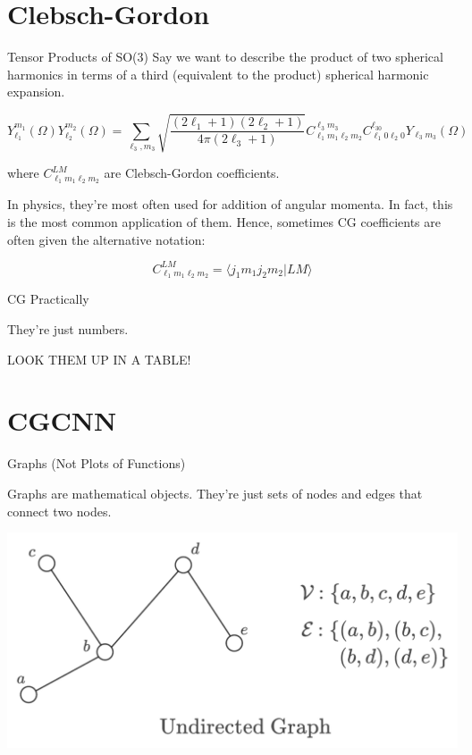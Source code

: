 \documentclass[handout, 11pt]{beamer}
\begin{document}
\section{Clebsch-Gordon}
\begin{frame}{Tensor Products of SO(3)}
Say we want to describe the product of two spherical harmonics in terms of a third (equivalent to the product) spherical harmonic expansion. \small

$$
Y_{\ell_1}^{m_1}(\Omega)Y_{\ell_2}^{m_2}(\Omega)=\sum_{\ell_3, m_3}\sqrt{\frac{(2\ell_1+1)(2\ell_2+1)}{4\pi(2\ell_3+1)}}C^{\ell_3m_3}_{\ell_1m_1\ell_2m_2}C^{\ell_30}_{\ell_1 0\ell_2 0}Y_{\ell_3m_3}(\Omega)
$$
\normalsize

where $C^{LM}_{\ell_1m_1\ell_2m_2}$ are Clebsch-Gordon coefficients.

\medskip\pause

In physics, they're most often used for addition of angular momenta. In fact, this is the most common application of them. Hence, sometimes CG coefficients are often given the alternative notation:

$$
C^{LM}_{\ell_1m_1\ell_2m_2} = \langle  j_1m_1 j_2m_2\vert  L M  \rangle
$$
\end{frame}


\begin{frame}{CG Practically}
\begin{center}

They're just numbers.

\vspace{.5cm}

LOOK THEM UP IN A TABLE!
\end{center}
\end{frame}

\section{CGCNN}
\begin{frame}{Graphs (Not Plots of Functions)}

Graphs are mathematical objects. They're just sets of nodes and edges that connect two nodes.

\begin{center}

\includegraphics[scale=0.35]{undgraphex.pdf}

\end{center}

\end{frame}
\end{document}

